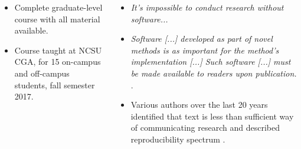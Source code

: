 \documentclass[25pt, margin=0mm, innermargin=25mm, blockverticalspace=25mm, colspace=25mm, subcolspace=8mm]{tikzposter}
\newcommand{\blocktitlewrap}[1]{\textsf{\textbf{\Huge#1}}}
\begin{document}
\begin{columns}
{

\begin{itemize}
 \item Complete graduate-level course with all material available.
 \item Course taught at NCSU CGA, for 15 on-campus and off-campus students, fall semester 2017.
\end{itemize}


\begin{itemize}
 \item \textit{It's impossible to conduct research without software...}
  \citep{hettrick2014uk, hettrick2014impossible}
 \item \textit{Software [...] developed as part of novel methods is as important for the method's implementation [...] Such software [...] must be made available to readers upon publication.}
  \citep{socialsoftware2007}.
 \item Various authors over the last 20 years identified
that text is less than sufficient way of communicating research and described reproducibility spectrum
\citep{buckheit1995wavelab, peng2011reproducible, rodriguez2016ciencia, marwick2017computational}.
\end{itemize}

}

%
%
%
%
%

\block{\blocktitlewrap{Course Syllabus}}{

\Large

}
\end{columns}
\end{document}

